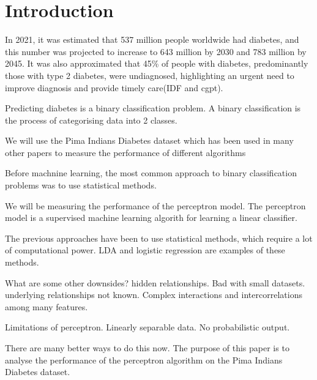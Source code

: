 \section{Introduction}
\label{sec:intro}

In 2021, it was estimated that 537 million people worldwide had diabetes, and this number was projected to increase to 643 million by 2030 and 783 million by 2045. It was also approximated that 45\% of people with diabetes, predominantly those with type 2 diabetes, were undiagnosed, highlighting an urgent need to improve diagnosis and provide timely care(IDF and cgpt).

Predicting diabetes is a binary classification problem. A binary classification is the process of categorising data into 2 classes.  

We will use the Pima Indians Diabetes dataset which has been used in many other papers to measure the performance of different algorithms

Before machnine learning, the most common approach to binary classification problems was to use statistical methods.

We will be measuring the performance of the perceptron model. The perceptron model is a supervised machine learning algorith for learning a linear classifier. 

The previous approaches have been to use statistical methods, which require a lot of computational power. LDA and logistic regression are examples of these methods.

What are some other downsides? hidden relationships. Bad with small datasets. underlying relationships not known. Complex interactions and intercorrelations among many features.

Limitations of perceptron. Linearly separable data. No probabilistic output.

There are many better ways to do this now. The purpose of this paper is to analyse the performance of the perceptron algorithm on the Pima Indians Diabetes dataset.
